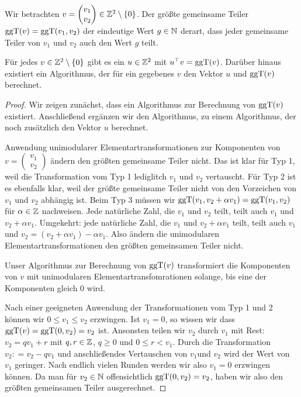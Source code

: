 	\label{ggT:zahlen} 
	Wir betrachten $v = \begin{pmatrix} v_1 \\ v_2 \end{pmatrix} \in \mathbb Z^2 \setminus \{0\}$. Der größte gemeinsame Teiler $\operatorname{ggT}(v) = \operatorname{ggT}(v_1,v_2)$ der eindeutige Wert $g \in \mathbb N$ derart, dass jeder gemeinsame Teiler von $v_1$ und $v_2$ auch den Wert $g$ teilt. 
	
	\begin{thm} 
		Für jedes $v \in \mathbb Z^2 \setminus \{0\}$ gibt es ein $u \in \mathbb Z^2$ mit $u^\top v = \operatorname{ggT}(v)$. Darüber hinaus existiert ein Algorithmus, der für ein gegebenes $v$ den Vektor $u$ und $\operatorname{ggT}(v)$ berechnet. 
	\end{thm} 
	\begin{proof} 
		Wir zeigen zunächst, dass ein Algorithmus zur Berechnung von $\operatorname{ggT}(v)$ existiert. Anschließend ergänzen wir den Algorithmus, zu einem Algorithmus, der noch zusätzlich den Vektor $u$ berechnet. 
		
		
		Anwendung unimodularer Elementartransformationen zur Komponenten von  $v = \begin{pmatrix} v_1 \\ v_2 \end{pmatrix}$ ändern den größten gemeinsame Teiler nicht. Das ist klar für Typ 1, weil die Transformation vom Typ 1 lediglitch $v_1$ und $v_2$ vertauscht. Für Typ 2 ist es ebenfalls klar, weil der größte gemeinsame Teiler nicht von den Vorzeichen von $v_1$ und $v_2$ abhängig ist. Beim Typ 3 müssen wir $\operatorname{ggT}(v_1, v_2 + \alpha v_1) = \operatorname{ggT}(v_1,v_2)$ für $\alpha \in \mathbb Z$ nachweisen. Jede natürliche Zahl, die $v_1$ und $v_2$ teilt, teilt auch $v_1$ und $v_2 + \alpha v_1$. Umgekehrt: jede natürliche Zahl, die $v_1$ und $v_2+ \alpha v_1$ teilt, teilt auch $v_1$ und $v_2 = (v_2+ \alpha v_1) - \alpha v_1$. Also ändern die unimodularen Elementartransformationen den größten gemeinsamen Teiler nicht. 
		
		Unser Algorithmus zur Berechnung von $\operatorname{ggT}(v)$ transformiert die Komponenten von $v$ mit unimodularen Elementartransfomrationen solange, bis eine der Komponenten gleich $0$ wird.  
		
		
		Nach einer geeigneten Anwendung der Transformationen vom Typ 1 und 2 können wir $0 \le v_1 \le v_2$ erzwingen. Ist $v_1=0$, so wissen wir dass $\operatorname{ggT}(v) = \operatorname{ggT}(0,v_2) = v_2$ ist. Ansonsten teilen wir $v_2$ durch $v_1$ mit Rest: $v_2 = q v_1 + r$ mit $q,r \in \mathbb Z$, $q \ge 0$ und $0 \le r < v_1$. Durch die Transformation $v_2 : = v_2 - q v_1$ und anschließendes Vertauschen von $v_1$und $v_2$ wird der Wert von $v_1$ geringer. Nach endlich vielen Runden werden wir also $v_1=0$ erzwingen können. Da man für $v_2 \in \mathbb N$ offensichtlich $\operatorname{ggT}(0,v_2) = v_2$, haben wir also den größten gemeinsamen Teiler ausgerechnet. 
		

\end{proof}
